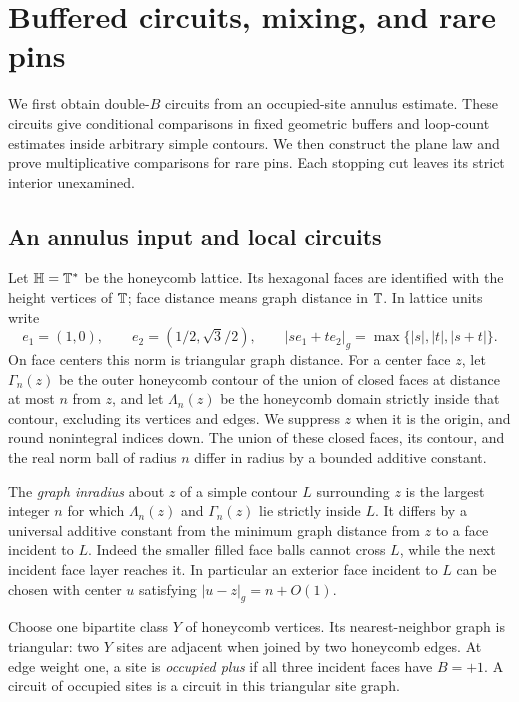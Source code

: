 \section{Buffered circuits, mixing, and rare pins}\label{sec:cuts}

We first obtain double-$B$ circuits from an occupied-site annulus
estimate.  These circuits give conditional comparisons in fixed geometric
buffers and loop-count estimates inside arbitrary simple contours.  We
then construct the plane law and prove multiplicative comparisons for
rare pins.  Each stopping cut leaves its strict interior unexamined.

\subsection{An annulus input and local circuits}

Let $\mathbb H=\mathbb T^*$ be the honeycomb lattice.  Its hexagonal faces are
identified with the height vertices of $\mathbb T$; face distance means graph
distance in $\mathbb T$.  In lattice units write
\[
 e_1=(1,0),\qquad e_2=(1/2,\sqrt3/2),\qquad
 |s e_1+t e_2|_g=\max\{|s|,|t|,|s+t|\}.
\]
On face centers this norm is triangular graph distance.  For a center
face $z$, let $\Gamma_n(z)$ be the outer honeycomb contour of the union
of closed faces at distance at most $n$ from $z$, and let $\Lambda_n(z)$
be the honeycomb domain strictly inside that contour, excluding its
vertices and edges.  We suppress $z$ when it is the origin, and round
nonintegral indices down.  The union of these closed faces, its contour,
and the real norm ball of radius $n$ differ in radius by a bounded
additive constant.

The \emph{graph inradius} about $z$ of a simple contour $L$ surrounding
$z$ is the largest integer $n$ for which $\Lambda_n(z)$ and $\Gamma_n(z)$
lie strictly inside $L$.  It differs by a universal additive constant
from the minimum graph distance from $z$ to a face incident to $L$.
Indeed the smaller filled face balls cannot cross $L$, while the next
incident face layer reaches it.  In particular an exterior face incident
to $L$ can be chosen with center $u$ satisfying $|u-z|_g=n+O(1)$.

Choose one bipartite class $Y$ of honeycomb vertices.  Its nearest-neighbor
graph is triangular: two $Y$ sites are adjacent when joined by two
honeycomb edges.  At edge weight one, a site is \emph{occupied plus} if
all three incident faces have $B=+1$.  A circuit of occupied sites is a
circuit in this triangular site graph.

